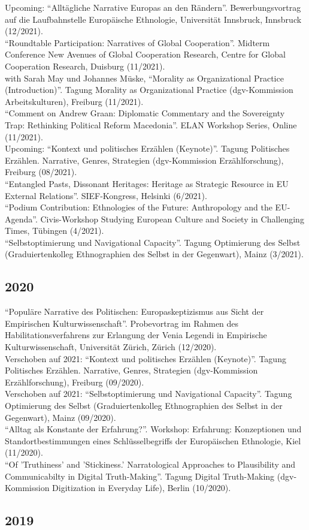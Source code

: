 Upcoming: \enquote{Alltägliche Narrative Europas an den Rändern}. Bewerbungsvortrag auf die Laufbahnstelle Europäische Ethnologie, Universität Innsbruck, Innsbruck (12/2021).\\[.25cm]\enquote{Roundtable Participation: Narratives of Global Cooperation}. Midterm Conference New Avenues of Global Cooperation Research, Centre for Global Cooperation Research, Duisburg (11/2021).\\[.25cm]with Sarah May und Johannes Müske, \enquote{Morality as Organizational Practice (Introduction)}. Tagung Morality as Organizational Practice (dgv-Kommission Arbeitskulturen), Freiburg (11/2021).\\[.25cm]\enquote{Comment on Andrew Graan: Diplomatic Commentary and the Sovereignty Trap: Rethinking Political Reform Macedonia}. ELAN Workshop Series, Online (11/2021).\\[.25cm]Upcoming: \enquote{Kontext und politisches Erzählen (Keynote)}. Tagung Politisches Erzählen. Narrative, Genres, Strategien (dgv-Kommission Erzählforschung), Freiburg (08/2021).\\[.25cm]\enquote{Entangled Pasts, Dissonant Heritages: Heritage as Strategic Resource in EU External Relations}. SIEF-Kongress, Helsinki (6/2021).\\[.25cm]\enquote{Podium Contribution: Ethnologies of the Future: Anthropology and the EU-Agenda}. Civis-Workshop Studying European Culture and Society in Challenging Times, Tübingen (4/2021).\\[.25cm]\enquote{Selbstoptimierung und Navigational Capacity}. Tagung Optimierung des Selbst (Graduiertenkolleg Ethnographien des Selbst in der Gegenwart), Mainz (3/2021).\subsection*{2020}
\enquote{Populäre Narrative des Politischen: Europaskeptizismus aus Sicht der Empirischen Kulturwissenschaft}. Probevortrag im Rahmen des Habilitationsverfahrens zur Erlangung der Venia Legendi in Empirische Kulturwissenschaft, Universität Zürich, Zürich (12/2020).\\[.25cm]Verschoben auf 2021: \enquote{Kontext und politisches Erzählen (Keynote)}. Tagung Politisches Erzählen. Narrative, Genres, Strategien (dgv-Kommission Erzählforschung), Freiburg (09/2020).\\[.25cm]Verschoben auf 2021: \enquote{Selbstoptimierung und Navigational Capacity}. Tagung Optimierung des Selbst (Graduiertenkolleg Ethnographien des Selbst in der Gegenwart), Mainz (09/2020).\\[.25cm]\enquote{Alltag als Konstante der Erfahrung?}. Workshop: Erfahrung: Konzeptionen und Standortbestimmungen eines Schlüsselbegriffs der Europäischen Ethnologie, Kiel (11/2020).\\[.25cm]\enquote{Of 'Truthiness' and 'Stickiness.' Narratological Approaches to Plausibility and Communicabilty in Digital Truth-Making}. Tagung Digital Truth-Making (dgv-Kommission Digitization in Everyday Life), Berlin (10/2020).\subsection*{2019}
